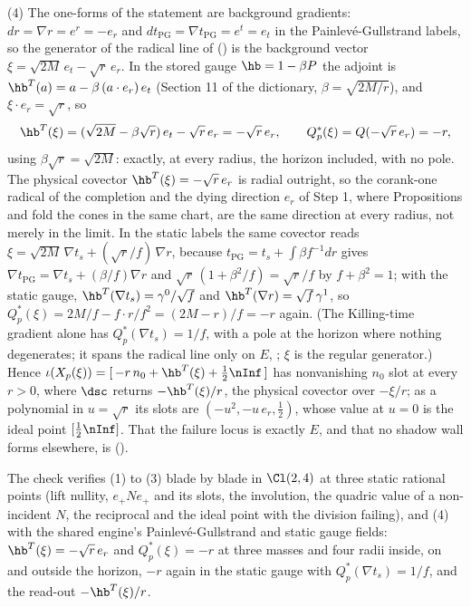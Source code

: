 (4) The one-forms of the statement are background gradients: $dr = \nabla r = e^{r} = -e_{r}$ and $dt_{\mathrm{PG}} = \nabla t_{\mathrm{PG}} = e^{t} = e_{t}$ in the Painlev\'e-Gullstrand labels, so the generator of the radical line of \cite[Thm.~8.7]{ButlerT4} () is the background vector $\xi = \sqrt{2M}\,e_{t} - \sqrt r\,e_{r}$. In the stored gauge $\hb = 1 - \beta P$ the adjoint is $\hb^{T}(a) = a - \beta\,(a\cdot e_{r})\,e_{t}$ (Section 11 of the dictionary, $\beta = \sqrt{2M/r}$), and $\xi\cdot e_{r} = \sqrt r$, so
\[
\hb^{T}(\xi) = (\sqrt{2M} - \beta\sqrt r)\,e_{t} - \sqrt r\,e_{r} = -\sqrt r\,e_{r}, \qquad Q^{*}_p(\xi) = Q(-\sqrt r\,e_{r}) = -r,
\]
using $\beta\sqrt r = \sqrt{2M}$: exactly, at every radius, the horizon included, with no pole. The physical covector $\hb^{T}(\xi) = -\sqrt r\,e_{r}$ is radial outright, so the corank-one radical of the completion and the dying direction $e_{r}$ of Step 1, where Propositions  and  fold the cones in the same chart, are the same direction at every radius, not merely in the limit. In the static labels the same covector reads $\xi = \sqrt{2M}\,\nabla t_{s} + (\sqrt r/f)\,\nabla r$, because $t_{\mathrm{PG}} = t_{s} + \int\beta f^{-1}dr$ gives $\nabla t_{\mathrm{PG}} = \nabla t_{s} + (\beta/f)\nabla r$ and $\sqrt r\,(1 + \beta^{2}/f) = \sqrt r/f$ by $f + \beta^{2} = 1$; with the static gauge, $\hb^{T}(\nabla t_{s}) = \gamma^{0}/\sqrt f$ and $\hb^{T}(\nabla r) = \sqrt f\,\gamma^{1}$, so $Q^{*}_p(\xi) = 2M/f - f\cdot r/f^{2} = (2M - r)/f = -r$ again. (The Killing-time gradient alone has $Q^{*}_p(\nabla t_{s}) = 1/f$, with a pole at the horizon where nothing degenerates; it spans the radical line only on $E$, \cite[Thm.~8.7(4)]{ButlerT4}; $\xi$ is the regular generator.) Hence $\iota(X_p(\xi)) = [\,-r\,n_{0} + \hb^{T}(\xi) + \tfrac12\nInf\,]$ has nonvanishing $n_{0}$ slot at every $r > 0$, where $\dsc$ returns $-\hb^{T}(\xi)/r$, the physical covector over $-\xi/r$; as a polynomial in $u = \sqrt r$ its slots are $(-u^{2}, -u\,e_{r}, \tfrac12)$, whose value at $u = 0$ is the ideal point $[\tfrac12\nInf]$. That the failure locus is exactly $E$, and that no shadow wall forms elsewhere, is \cite[Thm.~8.12]{ButlerT4} ().

The check verifies (1) to (3) blade by blade in $\Cl(2,4)$ at three static rational points (lift nullity, $e_{+}Ne_{+}$ and its slots, the involution, the quadric value of a non-incident $N$, the reciprocal and the ideal point with the division failing), and (4) with the shared engine's Painlev\'e-Gullstrand and static gauge fields: $\hb^{T}(\xi) = -\sqrt r\,e_{r}$ and $Q^{*}_p(\xi) = -r$ at three masses and four radii inside, on and outside the horizon, $-r$ again in the static gauge with $Q^{*}_p(\nabla t_{s}) = 1/f$, and the read-out $-\hb^{T}(\xi)/r$.


